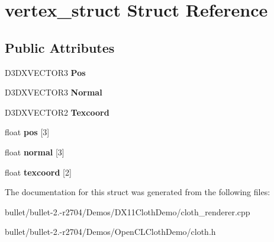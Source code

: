 \hypertarget{structvertex__struct}{\section{vertex\+\_\+struct Struct Reference}
\label{structvertex__struct}
}
\subsection*{Public Attributes}
\begin{DoxyCompactItemize}
\item 
\hypertarget{structvertex__struct_ae3dd4686730410570191176ff9476284}{D3\+D\+X\+V\+E\+C\+T\+O\+R3 {\bfseries Pos}}\label{structvertex__struct_ae3dd4686730410570191176ff9476284}

\item 
\hypertarget{structvertex__struct_a57a260bb07a7ad21fcdba3e65c46f79f}{D3\+D\+X\+V\+E\+C\+T\+O\+R3 {\bfseries Normal}}\label{structvertex__struct_a57a260bb07a7ad21fcdba3e65c46f79f}

\item 
\hypertarget{structvertex__struct_a6589fcb4ae177901688ef9c687446563}{D3\+D\+X\+V\+E\+C\+T\+O\+R2 {\bfseries Texcoord}}\label{structvertex__struct_a6589fcb4ae177901688ef9c687446563}

\item 
\hypertarget{structvertex__struct_a67b9ee14bb0a4b9ace87277aebbeddd7}{float {\bfseries pos} \mbox{[}3\mbox{]}}\label{structvertex__struct_a67b9ee14bb0a4b9ace87277aebbeddd7}

\item 
\hypertarget{structvertex__struct_a90cd3c48bbdf6f4c1827ad18e0887bb4}{float {\bfseries normal} \mbox{[}3\mbox{]}}\label{structvertex__struct_a90cd3c48bbdf6f4c1827ad18e0887bb4}

\item 
\hypertarget{structvertex__struct_abce1d23c0bef5ca358f4078d203ffb77}{float {\bfseries texcoord} \mbox{[}2\mbox{]}}\label{structvertex__struct_abce1d23c0bef5ca358f4078d203ffb77}

\end{DoxyCompactItemize}


The documentation for this struct was generated from the following files\+:\begin{DoxyCompactItemize}
\item 
bullet/bullet-\/2.-\/r2704/\+Demos/\+D\+X11\+Cloth\+Demo/cloth\+\_\+renderer.\+cpp\item 
bullet/bullet-\/2.-\/r2704/\+Demos/\+Open\+C\+L\+Cloth\+Demo/cloth.\+h\end{DoxyCompactItemize}
